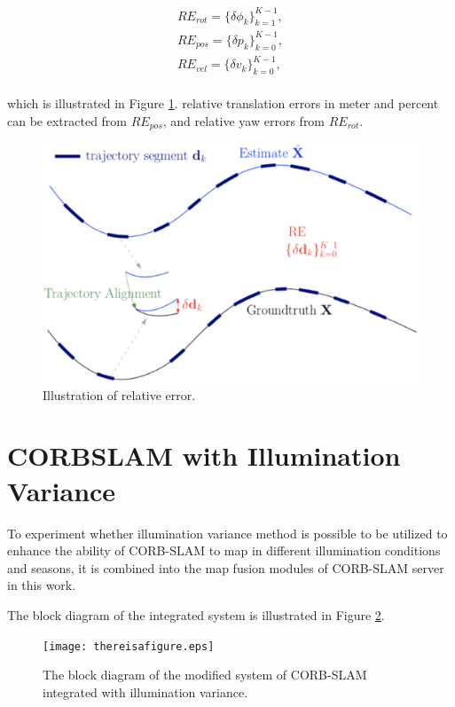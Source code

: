 \begin{inparaenum}[Step 1.]
	\begin{equation}
	\begin{array}{ll}
	RE_{rot}=\{\delta\phi_k\}_{k=1}^{K-1}, \\
	RE_{pos}=\{\delta p_k\}_{k=0}^{K-1}, \\
	RE_{vel}=\{\delta v_k\}_{k=0}^{K-1}, \\
	\end{array}
	\end{equation}
	
	which is illustrated in Figure \ref{fig:relerrcal}. relative translation errors in meter and percent can be extracted from $RE_{pos}$, and relative yaw errors from $RE_{rot}$.
	
	\begin{figure}[H]
		\centering
		\includegraphics[width=5in]{Chapter3/relerr.eps}
		\caption{Illustration of relative error.}
		\label{fig:relerrcal} 
	\end{figure}

\end{inparaenum}

\section{CORBSLAM with Illumination Variance}

To experiment whether illumination variance method is possible to be utilized to enhance the ability of CORB-SLAM to map in different illumination conditions and seasons, it is combined into the map fusion modules of CORB-SLAM server in this work. 

The block diagram of the integrated system is illustrated in Figure \ref{fig:coislamoverview}.
\begin{figure}[H]
	\centering
	\texttt{[image: thereisafigure.eps]}
	\caption{The block diagram of the modified system of CORB-SLAM integrated with illumination variance.}
	\label{fig:coislamoverview} 
\end{figure}

